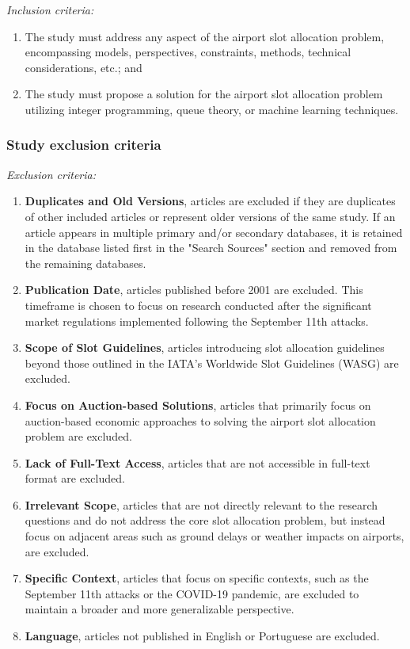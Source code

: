 \noindent \textit{Inclusion criteria:}



\begin{enumerate}
    \item The study must address any aspect of the airport slot allocation
	    problem, encompassing models, perspectives, constraints, methods,
		technical considerations, etc.; and
    \item The study must propose a solution for the airport slot allocation
	    problem utilizing integer programming, queue theory, or machine
		learning techniques.
\end{enumerate}



\subsubsection{Study exclusion criteria}

\textit{Exclusion criteria:}
\begin{enumerate}
    \item \textbf{Duplicates and Old Versions}, articles are excluded if they
	    are duplicates of other included articles or represent older
		versions of the same study. If an article appears in multiple
		primary and/or secondary databases, it is retained in the
		database listed first in the "Search Sources" section and
		removed from the remaining databases.
    \item \textbf{Publication Date}, articles published before 2001 are
	    excluded. This timeframe is chosen to focus on research conducted
		after the significant market regulations implemented following
		the September 11th attacks.
    \item \textbf{Scope of Slot Guidelines}, articles introducing slot
	    allocation guidelines beyond those outlined in the \acrshort{IATA}'s
		Worldwide Slot Guidelines (\acrshort{WASG}) \cite{WASG2020} are
		excluded.
    \item \textbf{Focus on Auction-based Solutions}, articles that primarily
	    focus on auction-based economic approaches to solving the airport
		slot allocation problem are excluded.
    \item \textbf{Lack of Full-Text Access}, articles that are not accessible in
	    full-text format are excluded.
    \item \textbf{Irrelevant Scope}, articles that are not directly relevant to
	    the research questions and do not address the core slot allocation
		problem, but instead focus on adjacent areas such as ground
		delays or weather impacts on airports, are excluded.
    \item \textbf{Specific Context}, articles that focus on specific contexts,
	    such as the September 11th attacks or the COVID-19 pandemic, are
		excluded to maintain a broader and more generalizable
		perspective.
    \item \textbf{Language}, articles not published in English or Portuguese are
	    excluded.
\end{enumerate}



